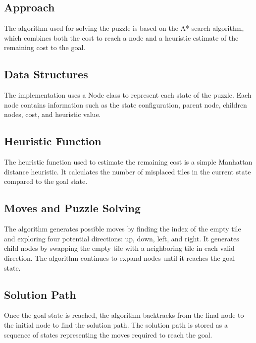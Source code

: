 \documentclass[12pt]{report}
\begin{document}
\subsection{Approach}
The algorithm used for solving the puzzle is based on the A* search algorithm, which combines both the cost to reach a node and a heuristic estimate of the remaining cost to the goal.

\subsection{Data Structures}
The implementation uses a Node class to represent each state of the puzzle. Each node contains information such as the state configuration, parent node, children nodes, cost, and heuristic value.

\subsection{Heuristic Function}
The heuristic function used to estimate the remaining cost is a simple Manhattan distance heuristic. It calculates the number of misplaced tiles in the current state compared to the goal state.

\subsection{Moves and Puzzle Solving}
The algorithm generates possible moves by finding the index of the empty tile and exploring four potential directions: up, down, left, and right. It generates child nodes by swapping the empty tile with a neighboring tile in each valid direction. The algorithm continues to expand nodes until it reaches the goal state.

\subsection{Solution Path}
Once the goal state is reached, the algorithm backtracks from the final node to the initial node to find the solution path. The solution path is stored as a sequence of states representing the moves required to reach the goal.
\end{document}
